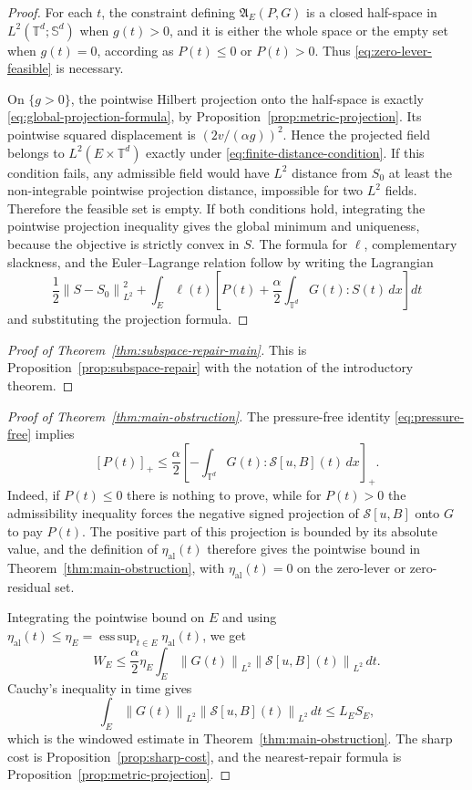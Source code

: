 \documentclass[11pt]{article}
\numberwithin{equation}{section}
\newcommand{\T}{\mathbb T}
\newcommand{\Sym}{\mathbb S}
\newcommand{\norm}[1]{\left\lVert #1\right\rVert}
\begin{document}
\begin{proof}
For each \(t\), the constraint defining \(\mathfrak A_E(P,G)\) is a closed
half-space in \(L^2(\T^d;\Sym^d)\) when \(g(t)>0\), and it is either the whole
space or the empty set when \(g(t)=0\), according as \(P(t)\le0\) or
\(P(t)>0\).  Thus \eqref{eq:zero-lever-feasible} is necessary.

On \(\{g>0\}\), the pointwise Hilbert projection onto the half-space is exactly
\eqref{eq:global-projection-formula}, by
Proposition~\ref{prop:metric-projection}.  Its pointwise squared displacement is
\((2v/(\alpha g))^2\).  Hence the projected field belongs to
\(L^2(E\times\T^d)\) exactly under
\eqref{eq:finite-distance-condition}.  If this condition fails, any admissible
field would have \(L^2\) distance from \(S_0\) at least the non-integrable
pointwise projection distance, impossible for two \(L^2\) fields.  Therefore
the feasible set is empty.  If both conditions hold, integrating the pointwise
projection inequality gives the global minimum and uniqueness, because the
objective is strictly convex in \(S\).  The formula for \(\ell\), complementary slackness,
and the Euler--Lagrange relation follow by writing the Lagrangian
\[
  \frac12\norm{S-S_0}_{L^2}^2
  +\int_E\ell(t)
  \left[
    P(t)+\frac{\alpha}{2}\int_{\T^d}G(t):S(t)\,dx
  \right]dt
\]
and substituting the projection formula.
\end{proof}

\begin{proof}[Proof of Theorem~\ref{thm:subspace-repair-main}]
This is Proposition~\ref{prop:subspace-repair} with the notation of the
introductory theorem.
\end{proof}

\begin{proof}[Proof of Theorem~\ref{thm:main-obstruction}]
The pressure-free identity \eqref{eq:pressure-free} implies
\[
  [P(t)]_+
  \le
  \frac{\alpha}{2}
  \left[-\int_{\T^d}G(t):\mathcal S[u,B](t)\,dx\right]_+.
\]
Indeed, if \(P(t)\le0\) there is nothing to prove, while for \(P(t)>0\) the
admissibility inequality forces the negative signed projection of
\(\mathcal S[u,B]\) onto \(G\) to pay \(P(t)\).  The positive part of this projection
is bounded by its absolute value, and the definition of \(\eta_{\mathrm{al}}(t)\)
therefore gives the pointwise bound in Theorem~\ref{thm:main-obstruction}, with
\(\eta_{\mathrm{al}}(t)=0\) on the zero-lever or zero-residual set.

Integrating the pointwise bound on \(E\) and using
\(\eta_{\mathrm{al}}(t)\le
\eta_E=\operatorname*{ess\,sup}_{t\in E}\eta_{\mathrm{al}}(t)\), we get
\[
  W_E
  \le
  \frac{\alpha}{2}\eta_E
  \int_E\norm{G(t)}_{L^2}\norm{\mathcal S[u,B](t)}_{L^2}\,dt .
\]
Cauchy's inequality in time gives
\[
  \int_E\norm{G(t)}_{L^2}\norm{\mathcal S[u,B](t)}_{L^2}\,dt
  \le L_ES_E,
\]
which is the windowed estimate in Theorem~\ref{thm:main-obstruction}.  The sharp cost is
Proposition~\ref{prop:sharp-cost}, and the nearest-repair formula is
Proposition~\ref{prop:metric-projection}.
\end{proof}
\end{document}
